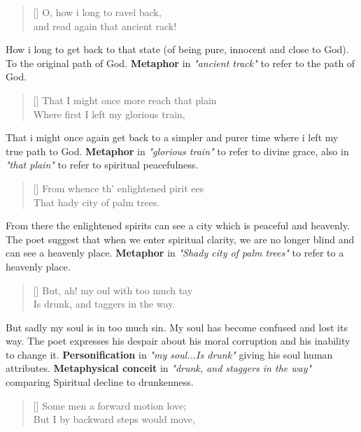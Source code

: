 \begin{verse}[\versewidth]
{\fontverse
O, how i long to ravel back,\\
and read again that ancient rack!
} 
\end{verse}

How i long to get back to that state (of being pure, innocent and close to God).
To the original path of God. \textbf{Metaphor} in \textit{"ancient track"} to refer to the path of God.

\begin{verse}[\versewidth]
{\fontverse
That I might once more reach that plain\\
Where first I left my glorious train, 
} 
\end{verse}

That i might once again get back to a simpler and purer time
where i left my true path to God. \textbf{Metaphor} in \textit{"glorious train"} 
to refer to divine grace, also in \textit{"that plain"} to refer to spiritual peacefulness.

\begin{verse}[\versewidth]
{\fontverse
From whence th’ enlightened pirit ees\\
That hady city of palm trees.
} 
\end{verse}

From there the enlightened spirits can see a city which is peaceful and heavenly.
The poet suggest that when we enter spiritual clarity, we are no longer blind
and can see a heavenly place. \textbf{Metaphor} in \textit{"Shady city of palm trees"} to refer
to a heavenly place. 

\begin{verse}[\versewidth]
{\fontverse
But, ah! my oul with too much tay\\
Is drunk, and taggers in the way. 
} 
\end{verse}

But sadly my soul is in too much sin. My soul has become confused 
and lost its way. The poet expresses his despair about his moral corruption
and his inability to change it. \textbf{Personification} in \textit{"my soul...Is drunk"} 
giving his soul human attributes. \textbf{Metaphysical conceit} in \textit{"drunk, and staggers in the way"} 
comparing Spiritual decline to drunkenness.



\begin{verse}[\versewidth]
{\fontverse
Some men a forward motion love;\\
But I by backward steps would move,
} 
\end{verse}


